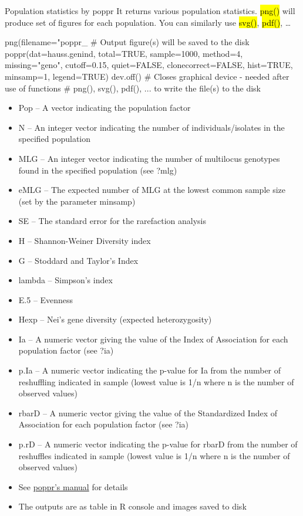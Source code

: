 \documentclass[compress, ucs, xelatex, 11pt, xcolor=svgnames,
  hyperref={
    bookmarks=true,
    unicode=true,
    colorlinks=true,
    pdftitle={Molecular data in R},
    plainpages=false,
    pdfauthor={Vojtech Zeisek},
    pdfsubject={Course about phylogeny and evolution in R},
    pdfcreator={XeLaTeX},
    pdfkeywords={R, evolution, phylogeny, molecular data},
    linkcolor=Tomato,
    anchorcolor=SaddleBrown,
    citecolor=Goldenrod,
    filecolor=DarkMagenta,
    menucolor=Sienna,
    urlcolor=DarkTurquoise,
    pdftex},
  url={hyphens, lowtilde} %
  ]{beamer}
\renewcommand{\texttt}[1]{\hl{\ttfamily #1}}
\begin{document}
\begin{frame}[fragile]{Population statistics by poppr} %
  It returns various population statistics. \texttt{png()} will produce set of figures for each population. You can similarly use \texttt{svg()}, \texttt{pdf()}, \ldots
  \begin{spluscode}
    png(filename="poppr_%
      # Output figure(s) will be saved to the disk
    poppr(dat=hauss.genind, total=TRUE, sample=1000, method=4,
      missing="geno", cutoff=0.15, quiet=FALSE, clonecorrect=FALSE,
      hist=TRUE, minsamp=1, legend=TRUE)
    dev.off() # Closes graphical device - needed after use of functions
              # png(), svg(), pdf(), ... to write the file(s) to the disk
  \end{spluscode}
  \begin{tiny}
    \begin{multicols}{2}
      \begin{itemize}
	\item Pop -- A vector indicating the population factor
	\item N -- An integer vector indicating the number of individuals/isolates in the specified population
	\item MLG -- An integer vector indicating the number of multilocus genotypes found in the specified population (see ?mlg)
	\item eMLG -- The expected number of MLG at the lowest common sample size (set by the parameter minsamp)
	\item SE -- The standard error for the rarefaction analysis
	\item H -- Shannon-Weiner Diversity index
	\item G -- Stoddard and Taylor's Index
	\item lambda -- Simpson's index
	\item E.5 -- Evenness
	\item Hexp -- Nei's gene diversity (expected heterozygosity)
	\item Ia -- A numeric vector giving the value of the Index of Association for each population factor (see ?ia)
	\item p.Ia -- A numeric vector indicating the p-value for Ia from the number of reshuffling indicated in sample (lowest value is 1/n where n is the number of observed values)
	\item rbarD -- A numeric vector giving the value of the Standardized Index of Association for each population factor (see ?ia)
	\item p.rD -- A numeric vector indicating the p-value for rbarD from the number of reshuffles indicated in sample (lowest value is 1/n where n is the number of observed values)
	\item See \href{http://grunwaldlab.cgrb.oregonstate.edu/primer-population-genetic-analyses-r/installation}{poppr's manual} for details
	\item The outputs are as table in R console and images saved to disk
      \end{itemize}
    \end{multicols}
  \end{tiny}
\end{frame}
\end{document}
